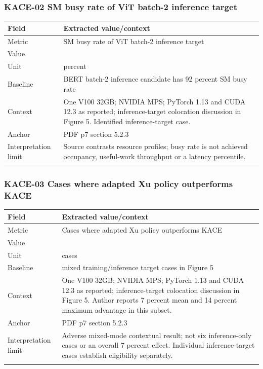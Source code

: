 \subsubsection*{KACE-02 SM busy rate of ViT batch-2 inference target}
\begin{longtable}{>{\raggedright\arraybackslash}p{}>{\raggedright\arraybackslash}p{}}
\toprule
\textbf{Field} & \textbf{Extracted value/context}\\\midrule\endhead
Metric & SM busy rate of ViT batch-2 inference target\\\addlinespace
Value & 29\\\addlinespace
Unit & percent\\\addlinespace
Baseline & BERT batch-2 inference candidate has 92 percent SM busy rate\\\addlinespace
Context & One V100 32GB;\allowbreak{} NVIDIA MPS;\allowbreak{} PyTorch 1.13 and CUDA 12.3 as reported;\allowbreak{} inference-target colocation discussion in Figure 5. Identified inference-target case.\\\addlinespace
Anchor & PDF p7 section 5.2.3\\\addlinespace
Interpretation limit & Source contrasts resource profiles;\allowbreak{} busy rate is not achieved occupancy,\allowbreak{} useful-work throughput or a latency percentile.\\\addlinespace
\bottomrule\end{longtable}
\subsubsection*{KACE-03 Cases where adapted Xu policy outperforms KACE}
\begin{longtable}{>{\raggedright\arraybackslash}p{}>{\raggedright\arraybackslash}p{}}
\toprule
\textbf{Field} & \textbf{Extracted value/context}\\\midrule\endhead
Metric & Cases where adapted Xu policy outperforms KACE\\\addlinespace
Value & 6\\\addlinespace
Unit & cases\\\addlinespace
Baseline & 21 mixed training/inference target cases in Figure 5\\\addlinespace
Context & One V100 32GB;\allowbreak{} NVIDIA MPS;\allowbreak{} PyTorch 1.13 and CUDA 12.3 as reported;\allowbreak{} inference-target colocation discussion in Figure 5. Author reports 7 percent mean and 14 percent maximum advantage in this subset.\\\addlinespace
Anchor & PDF p7 section 5.2.3\\\addlinespace
Interpretation limit & Adverse mixed-mode contextual result;\allowbreak{} not six inference-only cases or an overall 7 percent effect. Individual inference-target cases establish eligibility separately.\\\addlinespace
\bottomrule\end{longtable}
